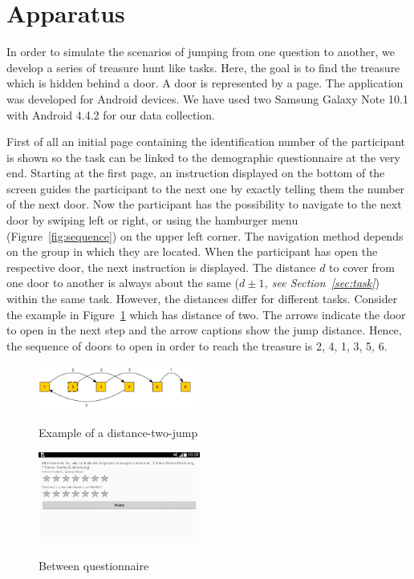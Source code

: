 \documentclass{sig-alternate-05-2015}
\begin{document}
\section{Apparatus}
In order to simulate the scenarios of jumping from one question to another, we develop a series of treasure hunt like tasks. Here, the goal is to find the treasure which is hidden behind a door. A door is represented by a page. The application was developed for Android devices. We have used two Samsung Galaxy Note 10.1 with Android 4.4.2 for our data collection.

First of all an initial page containing the identification number of the participant is shown so the task can be linked to the demographic questionnaire at the very end. Starting at the first page, an instruction displayed on the bottom of the screen guides the participant to the next one by exactly telling them the number of the next door. Now the participant has the possibility to navigate to the next door by swiping left or right, or using the hamburger menu (Figure~\ref{fig:sequence}) on the upper left corner. The navigation method depends on the group in which they are located. When the participant has open the respective door, the next instruction is displayed. The distance $d$ to cover from one door to another is always about the same ($d \pm 1$\textit{, see Section~\ref{sec:task}}) within the same task. However, the distances differ for different tasks. Consider the example in Figure~\ref{fig:jump} which has distance of two. The arrows indicate the door to open in the next step and the arrow captions show the jump distance. Hence, the sequence of doors to open in order to reach the treasure is 2, 4, 1, 3, 5, 6.
\begin{figure}
	\centering
	\includegraphics[width=0.45\textwidth]{pics/jump}\label{fig:jump}
	\caption{Example of a distance-two-jump}
\end{figure}
\begin{figure}
	\centering
	\includegraphics[width=0.475\textwidth]{pics/screenshots/global3-cut}\label{fig:between_questionnaire}
	\caption{Between questionnaire}
\end{figure}
\end{document}
